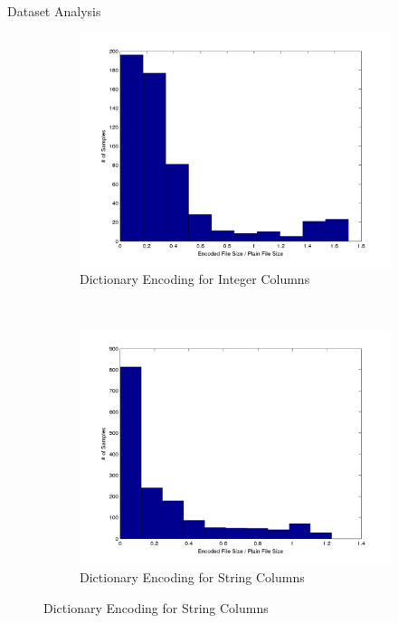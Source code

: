 \documentclass{beamer}
\newlength{\onecolwid}
\begin{document}
\begin{frame}[t]
\begin{columns}[t]
\begin{column}{\onecolwid}
\begin{block}{Dataset Analysis}
\begin{figure}
\begin{subfigure}{0.5\textwidth}
\includegraphics[scale=1]{img/integer_dict_hist}
\caption{Dictionary Encoding for Integer Columns}
\end{subfigure}~
\begin{subfigure}{0.5\textwidth}
\includegraphics[scale=1]{img/string_dict_hist}
\caption{Dictionary Encoding for String Columns}
\end{subfigure}
\end{figure}

\end{block}

\end{column}


\end{columns}
\end{frame}
\end{document}

